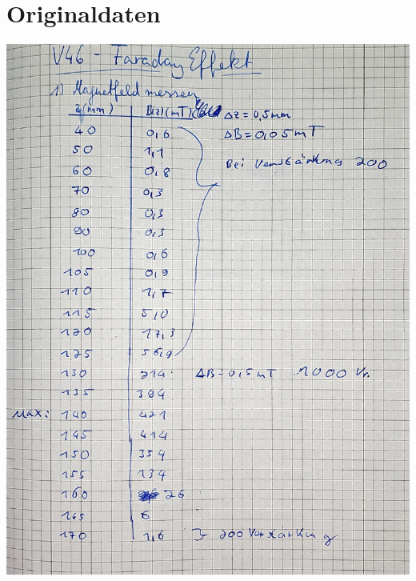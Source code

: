 \section{Originaldaten}
\label{sec:Originaldaten}

\includegraphics[width=\textwidth,page=1]{Bilder/v46originaldaten.pdf}
